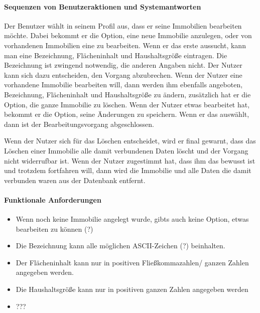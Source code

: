 \paragraph{Sequenzen von Benutzeraktionen und Systemantworten}
Der Benutzer wählt in seinem Profil aus, 
dass er seine Immobilien bearbeiten möchte. 
Dabei bekommt er die Option, eine neue Immobilie anzulegen, 
oder von vorhandenen Immobilien eine zu bearbeiten. 
Wenn er das erste aussucht, kann man eine Bezeichnung,
Flächeninhalt und Haushaltsgröße %
eintragen. Die Bezeichnung ist zwingend notwendig, %
die anderen Angaben nicht. 
Der Nutzer kann sich dazu entscheiden, den Vorgang abzubrechen.
Wenn der Nutzer eine vorhandene Immobilie bearbeiten will,
dann werden ihm ebenfalls angeboten, Bezeichnung, Flächeninhalt und 
Haushaltsgröße zu ändern,
zusätzlich hat er die Option, die ganze Immobilie zu löschen. 
Wenn der Nutzer etwas bearbeitet hat, bekommt er die Option, seine Änderungen zu speichern. 
Wenn er das auswählt, dann ist der Bearbeitungsvorgang abgeschlossen.

Wenn der Nutzer sich für das Löschen entscheidet, wird er final gewarnt, 
dass das Löschen einer Immobilie alle damit verbundenen Daten löscht und der Vorgang nicht widerrufbar ist.  
Wenn der Nutzer zugestimmt hat, dass ihm das bewusst ist und trotzdem fortfahren will, dann wird die Immobilie und alle Daten die damit verbunden waren aus der Datenbank entfernt.

\paragraph{Funktionale Anforderungen}

\begin{itemize}
    \item Wenn noch keine Immobilie angelegt wurde, gibts auch keine Option, etwas bearbeiten zu können (?)
    \item Die Bezeichnung kann alle möglichen ASCII-Zeichen (?) beinhalten.
    \item Der Flächeninhalt kann nur in positiven Fließkommazahlen/ ganzen Zahlen angegeben werden.
    \item Die Haushaltsgröße kann nur in positiven ganzen Zahlen angegeben werden
    \item ???
\end{itemize}

